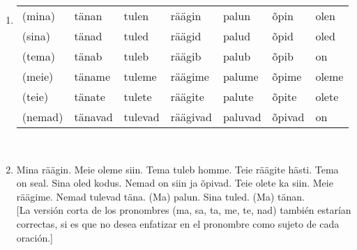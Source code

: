 \begin{enumerate}
\item 
\begin{tabular}{ l l l l l l l }
	(mina)	& tänan		& tulen		& räägin	& palun		& õpin		& olen \\
	(sina)	& tänad		& tuled		& räägid	& palud		& õpid		& oled \\
	(tema)	& tänab		& tuleb		& räägib	& palub		& õpib		& on \\
	(meie)	& täname	& tuleme	& räägime	& palume	& õpime		& oleme \\
	(teie)	& tänate	& tulete	& räägite	& palute	& õpite		& olete \\
	(nemad)	& tänavad	& tulevad	& räägivad	& paluvad	& õpivad	& on 
\end{tabular}\\ \bigskip
\item Mina räägin. Meie oleme siin. Tema tuleb homme. Teie räägite hästi. Tema on seal. Sina oled kodus. Nemad on siin ja õpivad. Teie olete ka siin. Meie räägime. Nemad tulevad täna. (Ma) palun. Sina tuled. (Ma) tänan.\\

[La versión corta de los pronombres (ma, sa, ta, me, te, nad) también estarían correctas, si es que no desea enfatizar en el pronombre como sujeto de cada oración.]
\end{enumerate}


